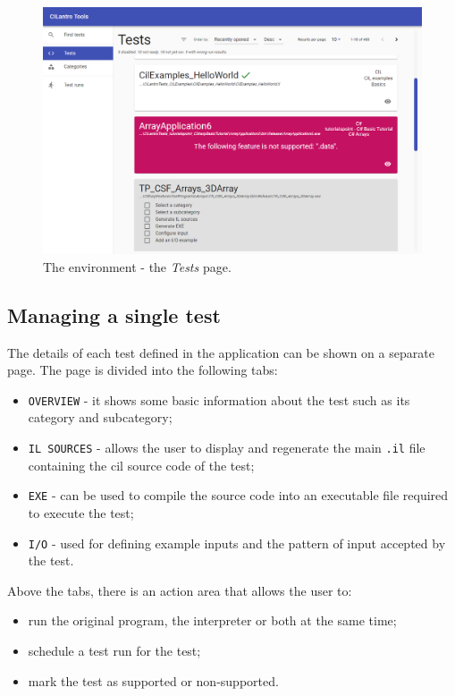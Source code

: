\documentclass[declaration,shortabstract,english,mgr]{iithesis}
\begin{document}
\begin{figure}
	\includegraphics[width=1\textwidth]{tools_tests.png}
    \centering
    \caption{The environment - the \textit{Tests} page.}
    \label{fig:tools_tests}
\end{figure}

\subsection{Managing a single test}

The details of each test defined in the application can be shown on a separate page. The page is divided into the following tabs:
\begin{itemize}
	\item{\texttt{OVERVIEW} - it shows some basic information about the test such as its category and subcategory};
	\item{\texttt{IL SOURCES} - allows the user to display and regenerate the main \texttt{.il} file containing the \acrshort{cil} source code of the test};
	\item{\texttt{EXE} - can be used to compile the source code into an executable file required to execute the test};
	\item{\texttt{I/O} - used for defining example inputs and the pattern of input accepted by the test}.
\end{itemize}

Above the tabs, there is an action area that allows the user to:
\begin{itemize}
	\item{run the original program, the interpreter or both at the same time};
	\item{schedule a test run for the test};
	\item{mark the test as supported or non-supported}.
\end{itemize}
\end{document}
